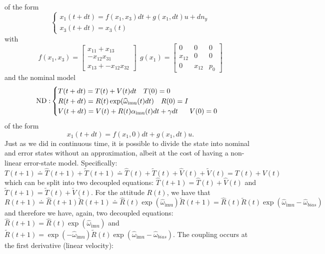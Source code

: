 \documentclass[]{article}
\newcommand{\ba}{\left[ \begin{array}}
\newcommand{\ea}{\end{array} \right]}
\def\w{\omega}
\def\imu{_\mathrm{imu}}
\begin{document}
{of the form
\begin{equation}
\begin{cases}
x_1(t+dt) = f(x_1, x_3)dt + g(x_1,dt)u + dn_y \\
x_3(t+dt) = x_3(t)
\end{cases}
\end{equation}
with 
\begin{equation}
f(x_1, x_3)  =\ba{c}
x_{11}+x_{13} \\ 
-x_{12}x_{31} \\
x_{13} + -x_{12 } x_{32} \ea
~~ g(x_1) = \ba{ccc}
0 & 0 & 0 \\
x_{12} & 0 & 0 \\
0 & x_{12} & p_0 \ea
\end{equation}
and the nominal model
\begin{equation}
{\rm ND:}
\begin{cases}
T(t+dt) = T(t) + V(t)dt ~~~ T(0) = 0\\
R(t+dt) = R(t)\exp(\widehat \w\imu (t)dt )~~~ R(0) = I \\
V(t+dt) = V(t) + R(t)\alpha\imu (t)dt + \gamma dt ~~~~~ V(0) = 0 \\
\end{cases}
\end{equation}
of the form
\begin{equation}
x_1(t+dt) = f(x_1, 0)dt + g(x_1,dt) u.
\end{equation}
Just as we did in continuous time, it is possible  to divide the state into nominal and error states without an approximation, albeit at the cost of having a non-linear error-state model. Specifically:
\begin{equation}
T(t+1) \doteq \hat T(t+1) + \tilde T(t+1) \doteq \hat T(t) + \tilde T(t) + \hat V(t) + \tilde V(t) = T(t) + V(t)
\end{equation}
which can be split into two decoupled equations: $\hat T(t+1) = \hat T(t) + \hat V(t)$ and $\tilde T(t+1) = \tilde T(t) + \tilde V(t)$. For the attitude $R(t)$, we have that
\begin{equation}
R(t+1) \doteq \hat R(t+1)\tilde R(t+1) \doteq \hat R(t)\exp(\widehat \w\imu ) \tilde R(t+1) = 
\hat R(t) \tilde R(t) \exp(\widehat \w\imu  - \widehat \w_{bias})
\end{equation}
and therefore we have, again, two decoupled equations: $\hat R(t+1) = \hat R(t)\exp(\widehat \w\imu )$ and $\tilde R(t+1) = \exp(-\widehat \w\imu )\tilde R(t) \exp(\widehat \w\imu  - \widehat \w_{bias})$. The coupling occurs at the first derivative (linear velocity):
}
\end{document}
